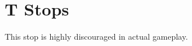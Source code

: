 \section{T Stops}
\label{sec:stopping/t_stops}

This stop is highly discouraged in actual gameplay.


